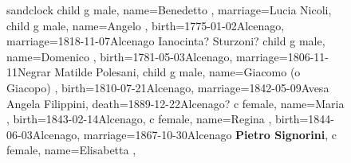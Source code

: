 \documentclass{article}
\begin{document}
\begin{figure}
\centering

    \begin{genealogypicture}[
        processing=database,
        database format=full,
        node size=3.5cm,
        level size=2.8cm,
        level distance=6mm,
        list separators hang=3mm,
        name font=\bfseries,
        surn code={\textcolor{black!50!black}{#1}},
        place text={\newline}{},
        date format=d month yyyy,
        tcbset={male/.style={colframe=blue,colback=blue!5},
        female/.style={colframe=red,colback=red!5}},
        box={fit basedim=7pt,boxsep=2pt,segmentation style=solid,
            halign=left,before upper=\parskip1pt,
            \gtrDBsex,
        },
    ]
    sandclock
    {
        child{
            g{
                male,
                name={Benedetto },
                marriage={Lucia Nicoli}{},
            }
            child{
                g{
                    male,
                    name={Angelo },
                    birth={1775-01-02}{Alcenago},
                    marriage={1818-11-07}{Alcenago \newline Ianocinta? Sturzoni?}
                }
            }
            child{
                g{
                    male,
                    name={Domenico },
                    birth={1781-05-03}{Alcenago},
                    marriage={1806-11-11}{Negrar \newline Matilde Polesani},
                }
                child{
                    g{
                        male,
                        name={Giacomo (o Giacopo) },
                        birth={1810-07-21}{Alcenago},
                        marriage={1842-05-09}{Avesa \newline Angela Filippini},
                        death={1889-12-22}{Alcenago?}
                    }
                    c{
                        female,
                        name={Maria },
                        birth={1843-02-14}{Alcenago},
                    }
                    c{
                        female,
                        name={Regina },
                        birth={1844-06-03}{Alcenago},
                        marriage={1867-10-30}{Alcenago \newline \textbf{Pietro Signorini}},
                    }
                    c{
                        female,
                        name={Elisabetta },
}}}}}
\end{genealogypicture}
\end{figure}
\end{document}
